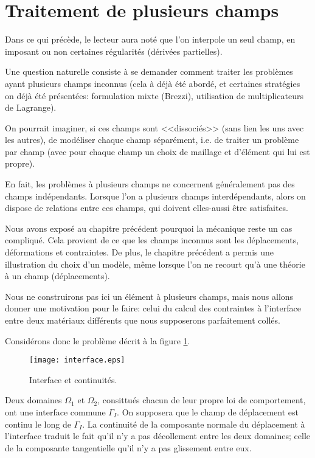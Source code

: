\medskip
\section{Traitement de plusieurs champs}\label{Sec-interf}

Dans ce qui précède, le lecteur aura noté que l'on interpole un seul
champ, en imposant ou non certaines régularités (dérivées partielles).

\medskip
Une question naturelle consiste à se demander comment traiter les
problèmes ayant plusieurs champs inconnus (cela à déjà été abordé,
et certaines stratégies on déjà été présentées: formulation mixte (Brezzi),
utilisation de multiplicateurs de Lagrange).

On pourrait imaginer, si ces champs sont <<dissociés>> (sans lien les uns avec les
autres), de modéliser chaque champ séparément, i.e. de traiter un
problème par champ (avec pour chaque champ un choix de maillage et
d'élément qui lui est propre).

En fait, les problèmes à plusieurs champs ne concernent généralement
pas des champs indépendants.
Lorsque l'on  a plusieurs champs interdépendants, alors on dispose de relations
entre ces champs, qui doivent elles-aussi être satisfaites.

\medskip
Nous avons exposé au chapitre précédent pourquoi la mécanique reste un cas
compliqué. Cela provient de ce que les champs inconnus sont les déplacements, 
déformations et contraintes. 
De plus, le chapitre précédent a permis une illustration du choix d'un modèle,
même lorsque l'on ne recourt qu'à une théorie à un champ (déplacements).

\medskip
Nous ne construirons pas ici un élément à plusieurs champs, mais nous
allons donner une motivation pour le faire: celui du calcul des contraintes à 
l'interface entre deux matériaux différents que nous supposerons parfaitement 
collés.

Considérons donc le problème décrit à la figure \ref{interf}.
\begin{figure}[ht]
\begin{center}
\texttt{[image: interface.eps]}
\end{center}
\caption{\label{interf} Interface et continuités.}
\end{figure}
Deux domaines $\Omega_1$ et $\Omega_2$, consittués chacun de leur
propre loi de comportement, ont une interface commune $\Gamma_I$.
On supposera que le champ de déplacement est continu le long de $\Gamma_I$.
La continuité de la composante normale du déplacement à l'interface traduit le
fait qu'il n'y a pas décollement entre les deux domaines; celle de la composante
tangentielle qu'il n'y a pas glissement entre eux.


